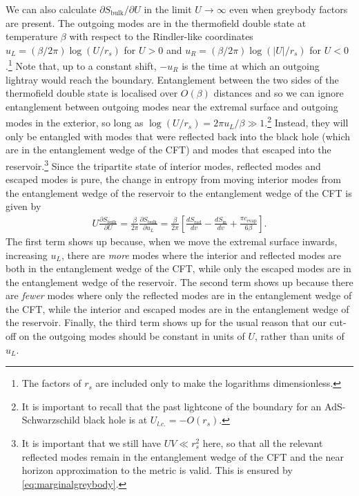\documentclass[11pt,a4paper]{article}
\newcommand{\Srad}{S_\text{rad} }
\begin{document}
We can also calculate $\partial S_\text{bulk}/\partial U$ in the limit $U \to \infty$ even when greybody factors are present. The outgoing modes are in the thermofield double state at temperature $\beta$ with respect to the Rindler-like coordinates $u_L = (\beta / 2 \pi) \log (U/r_s)$ for $U > 0$ and $u_R = (\beta / 2 \pi) \log (|U|/ r_s)$ for $U< 0$.\footnote{The factors of $r_s$ are included only to make the logarithms dimensionless.} Note that, up to a constant shift, $-u_R$ is the time at which an outgoing lightray would reach the boundary. Entanglement between the two sides of the thermofield double state is localised over $O(\beta)$ distances and so we can ignore entanglement between outgoing modes near the extremal surface and outgoing modes in the exterior, so long as $\log (U/r_s) = 2 \pi u_L / \beta \gg 1$.\footnote{It is important to recall that the past lightcone of the boundary for an AdS-Schwarzschild black hole is at $U_{l.c.} = -O(r_s)$.} Instead, they will only be entangled with modes that were reflected back into the black hole (which are in the entanglement wedge of the CFT) and modes that escaped into the reservoir.\footnote{It is important that we still have $UV \ll r_s^2$ here, so that all the relevant reflected modes remain in the entanglement wedge of the CFT and the near horizon approximation to the metric is valid. This is ensured by \eqref{eq:marginalgreybody}.}  Since the tripartite state of interior modes, reflected modes and escaped modes is pure, the change in entropy from moving interior modes from the entanglement wedge of the reservoir to the entanglement wedge of the CFT is given by
\begin{align}
U \frac{\partial S_\text{bulk}}{\partial U} = \frac{\beta}{2 \pi} \frac{\partial S_\text{bulk}}{\partial u_L} =  \frac{\beta}{2 \pi}\left[\frac{d \Srad}{dv} - \frac{d S_\text{in}}{d v} + \frac{\pi c_\text{evap}}{6 \beta}\right].
\end{align}
The first term shows up because, when we move the extremal surface inwards, increasing $u_L$, there are \emph{more} modes where the interior and reflected modes are both in the entanglement wedge of the CFT, while only the escaped modes are in the entanglement wedge of the reservoir. The second term shows up because there are \emph{fewer} modes where only the reflected modes are in the entanglement wedge of the CFT, while the interior and escaped modes are in the entanglement wedge of the reservoir. Finally, the third term shows up for the usual reason that our cut-off on the outgoing modes should be constant in units of $U$, rather than units of $u_L$.
\end{document}
